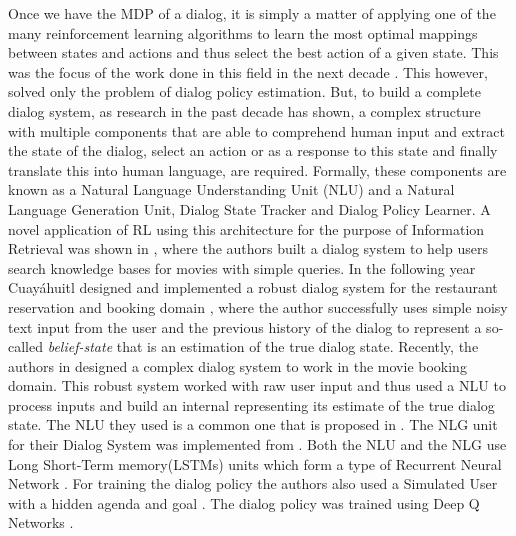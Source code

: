 \documentclass[12pt]{extarticle}
\numberwithin{equation}{section}
\begin{document}
	Once we have the MDP of a dialog, it is simply a matter of applying one of the many reinforcement learning algorithms to learn the most optimal mappings between states and actions and thus select the best action of a given state. This was the focus of the work done in this field in the next decade \cite{Young99probabilisticmethods}\cite{Singh_mdp}\cite{Pietquin_mdp}. This however, solved only the problem of dialog policy estimation. But, to build a complete dialog system, as research in the past decade has shown, a complex structure with multiple components that are able to comprehend human input and extract the state of the dialog, select an action or as a response to this state and finally translate this into human language, are required. Formally, these components are known as  a Natural Language Understanding Unit (NLU) and a Natural Language Generation Unit, Dialog State Tracker and Dialog Policy Learner. A novel application of RL using this architecture for the purpose of Information Retrieval was shown in \cite{Dhingra2016EndtoEndRL}, where the authors built a dialog system to help users search knowledge bases for movies with simple queries. In the following year Cuayáhuitl designed and implemented a robust dialog system for the restaurant reservation and booking domain \cite{Cuayhuitl2016SimpleDSAS}, where the author successfully uses simple noisy text input from the user and the previous history of the dialog to represent a so-called \textit{belief-state} that is an estimation of the true dialog state. Recently, the authors in \cite{Li17e2eDS} designed a complex dialog system to work in the movie booking domain. This robust system worked with raw user input and thus used a NLU to process inputs and build an internal  representing its estimate of the true dialog state. The NLU they used is a common one that is proposed in \cite{HakkaniTr2016NLU}. The NLG unit for their Dialog System was implemented from \cite{Wen_NLG}. Both the NLU and the NLG use Long Short-Term memory(LSTMs) units which form a type of Recurrent Neural Network \cite{hochreiter1997long}. For training the dialog policy the authors also used a Simulated User with a hidden agenda and goal \cite{Schatzmann_agenda_sim}\cite{Li_user_sim}. The dialog policy was trained using Deep Q Networks \cite{Mnih_DQN}.
\end{document}
